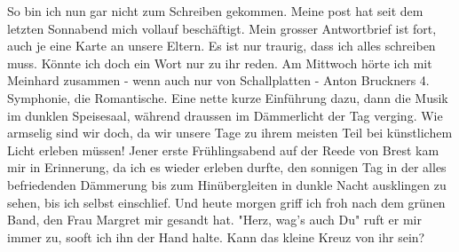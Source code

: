 \def\day{12. M\"{a}rz 1943.}
\mktitle

So bin ich nun gar nicht zum Schreiben gekommen.
Meine post hat seit dem letzten Sonnabend mich vollauf besch\"{a}ftigt.
Mein grosser Antwortbrief ist fort, auch je eine Karte an unsere Eltern.
Es ist nur traurig, dass ich alles schreiben muss.
K\"{o}nnte ich doch ein Wort nur zu ihr reden.
Am Mittwoch h\"{o}rte ich mit Meinhard zusammen - wenn auch nur von Schallplatten - Anton Bruckners 4. Symphonie, die Romantische.
Eine nette kurze Einf\"{u}hrung dazu, dann die Musik im dunklen Speisesaal, w\"{a}hrend draussen im D\"{a}mmerlicht der Tag verging.
Wie armselig sind wir doch, da wir unsere Tage zu ihrem meisten Teil bei k\"{u}nstlichem Licht erleben m\"{u}ssen!
Jener erste Fr\"{u}hlingsabend auf der Reede von Brest kam mir in Erinnerung, da ich es wieder erleben durfte, den sonnigen Tag in der alles befriedenden D\"{a}mmerung bis zum Hin\"{u}bergleiten in dunkle Nacht ausklingen zu sehen, bis ich selbst einschlief.
Und heute morgen griff ich froh nach dem gr\"{u}nen Band, den Frau Margret mir gesandt hat.
"Herz, wag's auch Du" ruft er mir immer zu, sooft ich ihn der Hand halte.
Kann das kleine Kreuz von ihr sein?

\clearpage
